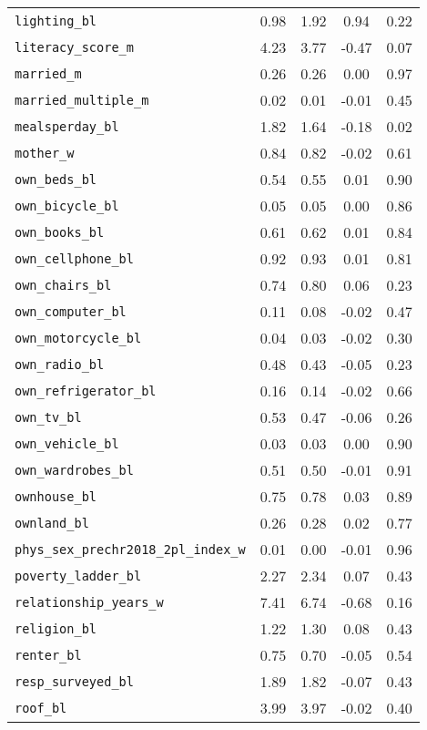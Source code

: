 \begin{longtable}{lcccc}
\addlinespace
\texttt{lighting\_bl} & 0.98 & 1.92 & 0.94 & 0.22\\
\texttt{literacy\_score\_m} & 4.23 & 3.77 & -0.47 & 0.07\\
\texttt{married\_m} & 0.26 & 0.26 & 0.00 & 0.97\\
\texttt{married\_multiple\_m} & 0.02 & 0.01 & -0.01 & 0.45\\
\texttt{mealsperday\_bl} & 1.82 & 1.64 & -0.18 & 0.02\\
\addlinespace
\texttt{mother\_w} & 0.84 & 0.82 & -0.02 & 0.61\\
\texttt{own\_beds\_bl} & 0.54 & 0.55 & 0.01 & 0.90\\
\texttt{own\_bicycle\_bl} & 0.05 & 0.05 & 0.00 & 0.86\\
\texttt{own\_books\_bl} & 0.61 & 0.62 & 0.01 & 0.84\\
\texttt{own\_cellphone\_bl} & 0.92 & 0.93 & 0.01 & 0.81\\
\addlinespace
\texttt{own\_chairs\_bl} & 0.74 & 0.80 & 0.06 & 0.23\\
\texttt{own\_computer\_bl} & 0.11 & 0.08 & -0.02 & 0.47\\
\texttt{own\_motorcycle\_bl} & 0.04 & 0.03 & -0.02 & 0.30\\
\texttt{own\_radio\_bl} & 0.48 & 0.43 & -0.05 & 0.23\\
\texttt{own\_refrigerator\_bl} & 0.16 & 0.14 & -0.02 & 0.66\\
\addlinespace
\texttt{own\_tv\_bl} & 0.53 & 0.47 & -0.06 & 0.26\\
\texttt{own\_vehicle\_bl} & 0.03 & 0.03 & 0.00 & 0.90\\
\texttt{own\_wardrobes\_bl} & 0.51 & 0.50 & -0.01 & 0.91\\
\texttt{ownhouse\_bl} & 0.75 & 0.78 & 0.03 & 0.89\\
\texttt{ownland\_bl} & 0.26 & 0.28 & 0.02 & 0.77\\
\addlinespace
\texttt{phys\_sex\_prechr2018\_2pl\_index\_w} & 0.01 & 0.00 & -0.01 & 0.96\\
\texttt{poverty\_ladder\_bl} & 2.27 & 2.34 & 0.07 & 0.43\\
\texttt{relationship\_years\_w} & 7.41 & 6.74 & -0.68 & 0.16\\
\texttt{religion\_bl} & 1.22 & 1.30 & 0.08 & 0.43\\
\texttt{renter\_bl} & 0.75 & 0.70 & -0.05 & 0.54\\
\addlinespace
\texttt{resp\_surveyed\_bl} & 1.89 & 1.82 & -0.07 & 0.43\\
\texttt{roof\_bl} & 3.99 & 3.97 & -0.02 & 0.40\\

\end{longtable}
